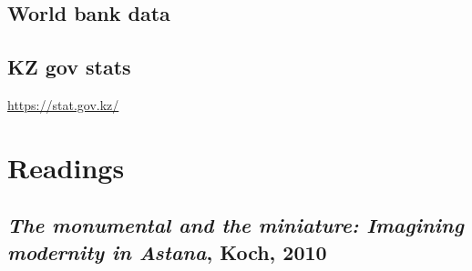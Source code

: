 \documentclass{article}
\begin{document}
\subsection{World bank data}

\subsection{KZ gov stats}

\url{https://stat.gov.kz/}

\section{Readings}

\subsection{\textit{The monumental and the miniature: Imagining modernity in Astana}, Koch, 2010}
\end{document}
